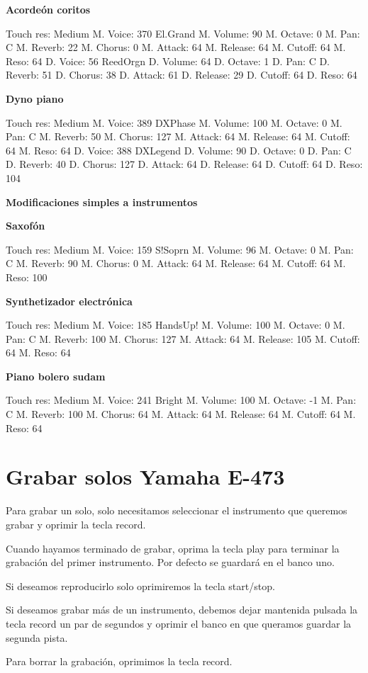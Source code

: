 \textbf{Acorde\'on coritos}
\vskip 25pt

Touch res: Medium
M. Voice: 370 El.Grand
M. Volume: 90
M. Octave: 0
M. Pan: C
M. Reverb: 22
M. Chorus: 0
M. Attack: 64
M. Release: 64
M. Cutoff: 64
M. Reso: 64
D. Voice: 56 ReedOrgn
D. Volume: 64
D. Octave: 1
D. Pan: C
D. Reverb: 51
D. Chorus: 38
D. Attack: 61
D. Release: 29
D. Cutoff: 64
D. Reso: 64
\vskip 25pt

\textbf{Dyno piano}
\vskip 25pt

Touch res: Medium
M. Voice: 389 DXPhase
M. Volume: 100
M. Octave: 0
M. Pan: C
M. Reverb: 50
M. Chorus: 127
M. Attack: 64
M. Release: 64
M. Cutoff: 64
M. Reso: 64
D. Voice: 388 DXLegend
D. Volume: 90
D. Octave: 0
D. Pan: C
D. Reverb: 40
D. Chorus: 127
D. Attack: 64
D. Release: 64
D. Cutoff: 64
D. Reso: 104
\vskip 25pt

\textbf{Modificaciones simples a instrumentos}

\textbf{Saxof\'on}
\vskip 25pt

Touch res: Medium
M. Voice: 159 S!Soprn
M. Volume: 96
M. Octave: 0
M. Pan: C
M. Reverb: 90
M. Chorus: 0
M. Attack: 64
M. Release: 64
M. Cutoff: 64
M. Reso: 100

\textbf{Synthetizador electr\'onica}
\vskip 25pt

Touch res: Medium
M. Voice: 185 HandsUp!
M. Volume: 100
M. Octave: 0
M. Pan: C
M. Reverb: 100
M. Chorus: 127
M. Attack: 64
M. Release: 105
M. Cutoff: 64
M. Reso: 64

\textbf{Piano bolero sudam}
\vskip 25pt

Touch res: Medium
M. Voice: 241 Bright
M. Volume: 100
M. Octave: -1
M. Pan: C
M. Reverb: 100
M. Chorus: 64
M. Attack: 64
M. Release: 64
M. Cutoff: 64
M. Reso: 64

\section*{Grabar solos Yamaha E-473}

Para grabar un solo, solo necesitamos seleccionar el instrumento que queremos grabar y oprimir la tecla record.

Cuando hayamos terminado de grabar, oprima la tecla play para terminar la grabaci\'on del primer instrumento.
Por defecto se guardar\'a en el banco uno.

Si deseamos reproducirlo solo oprimiremos la tecla start/stop.

Si deseamos grabar m\'as de un instrumento, debemos dejar mantenida pulsada la tecla record un par de segundos y oprimir el banco en que queramos guardar la segunda pista.

Para borrar la grabaci\'on, oprimimos la tecla record.